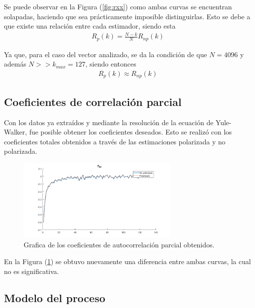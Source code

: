 Se puede observar en la Figura (\ref{fig:rxx}) como ambas curvas se encuentran solapadas, haciendo que sea prácticamente imposible distinguirlas.
Esto se debe a que existe una relación entre cada estimador, siendo esta
\begin{equation*}
\begin{gathered}
	R_{p}(k) = \frac{N - k}{N} R_{np}(k)
\end{gathered}
\end{equation*}

Ya que, para el caso del vector analizado, se da la condición de que $N = 4096$ y además $N >> k_{max} = 127$, siendo entonces
\begin{equation*}
\begin{gathered}
	R_{p}(k) \approx R_{np}(k)
\end{gathered}
\end{equation*}

\subsection{Coeficientes de correlación parcial}

Con los datos ya extraídos y mediante la resolución de la ecuación de Yule-Walker, fue posible obtener los coeficientes deseados. Esto se realizó con los coeficientes totales obtenidos a través de las estimaciones polarizada y no polarizada.
\begin{figure}[H]
\centering
	\includegraphics[width=0.7\textwidth, trim = {0 0 0 0.7cm},clip]{./ImagenesEjercicio2/phikk.png}
	\caption{Grafica de los coeficientes de autocorrelación parcial obtenidos.}
	\label{fig:phikk}
\end{figure}

En la Figura (\ref{fig:phikk}) se obtuvo nuevamente una diferencia entre ambas curvas, la cual no es significativa.

\subsection{Modelo del proceso}
\label{subsec:modelo}

